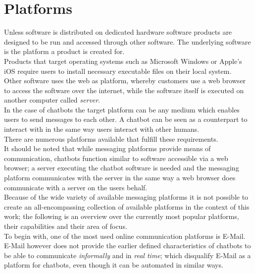 \chapter{Platforms}


Unless software is distributed on dedicated hardware software products are designed to be run and accessed through other software. The underlying software is the platform a product is created for.
\\
Products that target operating systems such as Microsoft Windows or Apple's iOS require users to install necessary executable files on their local system.
\\
Other software uses the web as platform, whereby customers use a web browser to access the software over the internet, while the software itself is executed on another computer called \emph{server}.
\\

In the case of chatbots the target platform can be any medium which enables users to send messages to each other. A chatbot can be seen as a counterpart to interact with in the same way users interact with other humans.
\\

There are numerous platforms available that fulfill these requirements.
\\

It should be noted that while messaging platforms provide means of communication, chatbots function similar to software accessible via a web browser; a server executing the chatbot software is needed and the messaging platform communicates with the server in the same way a web browser does communicate with a server on the users behalf.
\\

Because of the wide variety of available messaging platforms it is not possible to create an all-encompassing collection of available platforms in the context of this work; the following is an overview over the currently most popular platforms, their capabilities and their area of focus.
\\

To begin with, one of the most used online communication platforms is E-Mail.
\\
E-Mail however does not provide the earlier defined characteristics of chatbots to be able to communicate \emph{informally} and in \emph{real time}; which disqualify E-Mail as a platform for chatbots, even though it can be automated in similar ways.
\\

